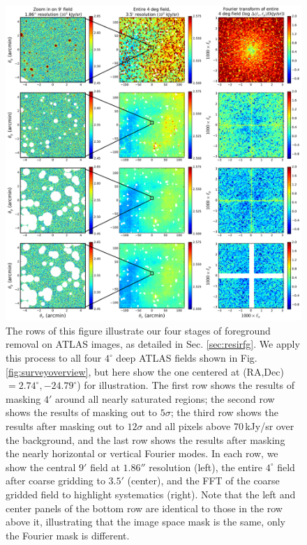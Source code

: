 \documentclass[numberedappendix]{emulateapj}
\begin{document}
\begin{figure}[h]
\centering
\includegraphics[width=7in]{big_foreground_masking_study_2_magoffset=20_56+0_274.pdf}
\caption[Images of our 850\,nm field after various stages of foreground masking.]{The rows of this figure illustrate our four stages of foreground removal on ATLAS images, as detailed in Sec. \ref{sec:resirfg}. We apply this process to all four $4^\circ$ deep ATLAS fields shown in Fig. \ref{fig:surveyoverview}, but here show the one centered at (RA,Dec)$=2.74^\circ, -24.79^\circ$) for illustration. The first row shows the results of masking $4'$ around all nearly saturated regions; the second row shows the results of masking out to $5\sigma$; the third row shows the results after masking out to $12\sigma$ and all pixels above 70\,kJy/sr over the background, and the last row shows the results after masking the nearly horizontal or vertical Fourier modes. In each row, we show the central $9'$ field at $1.86''$ resolution (left), the entire $4^\circ$ field after coarse gridding to $3.5'$ (center), and the FFT of the coarse gridded field to highlight systematics (right). Note that the left and center panels of the bottom row are identical to those in the row above it, illustrating that the image space mask is the same, only the Fourier mask is different.}
\label{fig:bigfgmaskingstudy}
\end{figure}
\end{document}
